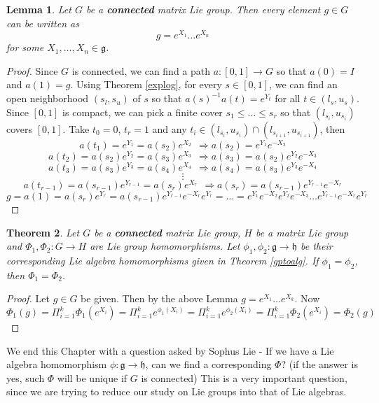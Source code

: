 \documentclass[11pt]{book}
\newtheorem{theorem}{Theorem}[section]
\newtheorem{lemma}[theorem]{Lemma}
\newcommand{\mf}[1]{\mathfrak{#1}}
\begin{document}
\begin{lemma} \label{connexp}
Let $G$ be a \textbf{connected} matrix Lie group. Then every element $g \in G$ can be written as
$$g = e^{X_1}\dots e^{X_n}$$
for some $X_1, \dots, X_n \in \mf{g}$.
\end{lemma}
\begin{proof}
Since $G$ is connected, we can find a path $a: [0,1] \to G$ so that $a(0) = I$ and $a(1) = g$. Using Theorem \ref{explog}, for every $s \in [0,1]$, we can find an open neighborhood $(s_l, s_u)$ of $s$ so that $a(s)^{-1}a(t) = e^{Y_t}$ for all $t \in (l_s, u_s)$. Since $[0,1]$ is compact, we can pick a finite cover $s_1 \leq \dots \leq s_r$ so that $(l_{s_i}, u_{s_i})$ covers $[0,1]$. Take $t_0 = 0$, $t_r = 1$ and any $t_i \in (l_{s_i}, u_{s_i}) \cap (l_{s_{i+1}}, u_{s_{i+1}})$, then
$$a(t_1) = e^{Y_1} = a(s_2)e^{X_2}\ \ \Longrightarrow  a(s_2) = e^{Y_1}e^{-X_2}$$
$$a(t_2) = a(s_2)e^{Y_2} = a(s_3)e^{X_3}\ \ \Longrightarrow  a(s_3) = a(s_2)e^{Y_2}e^{-X_3}$$
$$a(t_3) = a(s_3)e^{Y_3} = a(s_4)e^{X_4}\ \ \Longrightarrow  a(s_4) = a(s_3)e^{Y_3}e^{-X_4}$$
$$\vdots$$
$$a(t_{r-1}) = a(s_{r-1})e^{Y_{r-1}} = a(s_r)e^{X_r}\ \ \Longrightarrow  a(s_r) = a(s_{r-1})e^{Y_{r-1}}e^{-X_r}$$
$$g = a(1) = a(s_r)e^{Y_r} = a(s_{r-1})e^{Y_{r-1}}e^{-X_r}e^{Y_r} = \dots = e^{Y_1}e^{-X_2}e^{Y_2}e^{-X_3}\dots e^{Y_{r-1}}e^{-X_r}e^{Y_r}$$
\end{proof}

\begin{theorem}
Let $G$ be a \textbf{connected} matrix Lie group, $H$ be a matrix Lie group and $\Phi_1, \Phi_2: G \to H$ are Lie group homomorphisms. Let $\phi_1, \phi_2: \mf{g} \to \mf{h}$ be their corresponding Lie algebra homomorphisms given in Theorem \ref{gptoalg}. If $\phi_1 = \phi_2$, then $\Phi_1 = \Phi_2$.
\end{theorem}
\begin{proof}
Let $g \in G$ be given. Then by the above Lemma $g = e^{X_1}\dots e^{X_k}$. Now
$$\Phi_1(g) = \Pi_{i=1}^{k}\Phi_1(e^{X_i}) = \Pi_{i=1}^{k} e^{\phi_1(X_i)} = \Pi_{i=1}^{k} e^{\phi_2(X_i)} = \Pi_{i=1}^{k} \Phi_2(e^{X_i}) = \Phi_2(g)$$
\end{proof}

We end this Chapter with a question asked by Sophus Lie -
If we have a Lie algebra homomorphism $\phi: \mf{g} \to \mf{h}$, can we find a corresponding $\Phi$? (if the answer is yes, such $\Phi$ will be unique if $G$ is connected) This is a very important question, since we are trying to reduce our study on Lie groups into that of Lie algebras.\\
\end{document}
